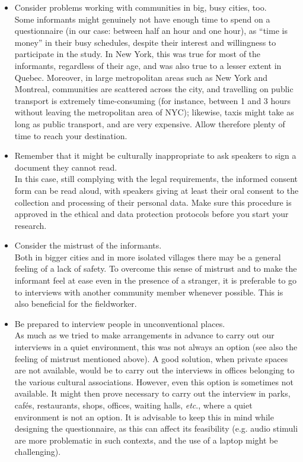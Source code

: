 \documentclass[output=paper,hidelinks]{langscibook}
\begin{document}
\begin{itemize}
\item Consider problems working with communities in big, busy cities, too.\\
Some informants might genuinely not have enough time to spend on a questionnaire (in our case: between half an hour and one hour), as ``time is money'' in their busy schedules, despite their interest and willingness to participate in the study. In New York, this was true for most of the informants, regardless of their age, and was also true to a lesser extent in Quebec. Moreover, in large metropolitan areas such as New York and Montreal, communities are scattered across the city, and travelling on public transport is extremely time-consuming (for instance, between 1 and 3 hours without leaving the metropolitan area of NYC); likewise, taxis might take as long as public transport, and are very expensive. Allow therefore plenty of time to reach your destination.
\item Remember that it might be culturally inappropriate to ask speakers to sign a document they cannot read.\\
In this case, still complying with the legal requirements, the informed consent form can be read aloud, with speakers giving at least their oral consent to the collection and processing of their personal data. Make sure this procedure is approved in the ethical and data protection protocols before you start your research.
\item Consider the mistrust of the informants.\\
Both in bigger cities and in more isolated villages there may be a general feeling of a lack of safety. To overcome this sense of mistrust and to make the informant feel at ease even in the presence of a stranger, it is preferable to go to interviews with another community member whenever possible. This is also beneficial for the fieldworker.
\item Be prepared to interview people in unconventional places.\\
As much as we tried to make arrangements in advance to carry out our interviews in a quiet environment, this was not always an option (see also the feeling of mistrust mentioned above). A good solution, when private spaces are not available, would be to carry out the interviews in offices belonging to the various cultural associations. However, even this option is sometimes not available. It might then prove necessary to carry out the interview in parks, cafés, restaurants, shops, offices, waiting halls, \textit{etc}., where a quiet environment is not an option. It is advisable to keep this in mind while designing the questionnaire, as this can affect its feasibility (e.g. audio stimuli are more problematic in such contexts, and the use of a laptop might be challenging).
\end{itemize}
\end{document}
